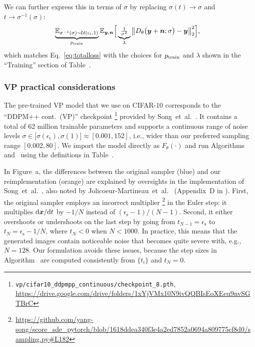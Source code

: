 We can further express this in terms of $\sigma$ by replacing $\sigma(t) \rightarrow \sigma$ and $t \rightarrow \sigma^{-1}(\sigma)$:
\begin{equation}
  \underbrace{\mathbb{E}_{\sigma^{-1}(\sigma) \sim \mathcal{U}(\epsilon_\text{t}, 1)}}_{p_\text{train}} \mathbb{E}_{\boldsymbol{y}, \boldsymbol{n}} \Big[ \underbrace{\tfrac{1}{\sigma^2}}_{\lambda} \big\lVert D_\theta \big( \boldsymbol{y} + \boldsymbol{n}; \sigma \big) - \boldsymbol{y} \big\rVert^2_2 \Big]
  \label{eq:vploss}
  \text{,}
\end{equation}
which matches Eq.~\ref{eq:totalloss} with the choices for $p_\text{train}$ and $\lambda$ shown in the ``Training'' section of Table~.

\subsubsection{VP practical considerations}

The pre-trained VP model that we use on CIFAR-10 corresponds to the ``DDPM++ cont.\ (VP)'' checkpoint%
\footnote{\tiny\texttt{vp/cifar10\_ddpmpp\_continuous/checkpoint\_8.pth}, \url{https://drive.google.com/drive/folders/1xYjVMx10N9ivQQBIsEoXEeu9nvSGTBrC}}
provided by Song~et~al.~\cite{Song2021sde}.
It contains a total of 62 million trainable parameters and supports a continuous range of noise levels $\sigma \in \big[ \sigma(\epsilon_\text{t}), \sigma(1) \big] \approx [0.001, 152]$, i.e., wider than our preferred sampling range $[0.002, 80]$.
We import the model directly as $F_\theta(\cdot)$ and run Algorithms~ and~ using the definitions in Table~.

In Figure~a, the differences between the original sampler (blue) and our reimplementation (orange) are explained by oversights in the implementation of Song~et~al.~\cite{Song2021sde}, also noted by Jolicoeur-Martineau~et~al.~\cite{Jolicoeur2021} (Appendix~D in \cite{Jolicoeur2021}).
First, the original sampler employs an incorrect multiplier%
\footnote{\tiny\url{https://github.com/yang-song/score\_sde\_pytorch/blob/1618ddea340f3e4a2ed7852a0694a809775cf8d0/sampling.py\#L182}}
in the Euler step: it multiplies $\mathrm{d}\boldsymbol{x} / \mathrm{d} t$ by $-1 / N$ instead of $(\epsilon_\text{s} - 1) / (N - 1)$.
Second, it either overshoots or undershoots on the last step by going from $t_{N-1} = \epsilon_\text{s}$ to $t_N = \epsilon_\text{s} - 1 / N$, where $t_N < 0$ when $N < 1000$.
In practice, this means that the generated images contain noticeable noise that becomes quite severe with, e.g., $N = 128$.
Our formulation avoids these issues, because the step sizes in Algorithm~ are computed consistently from $\{t_i\}$ and $t_N = 0$.

